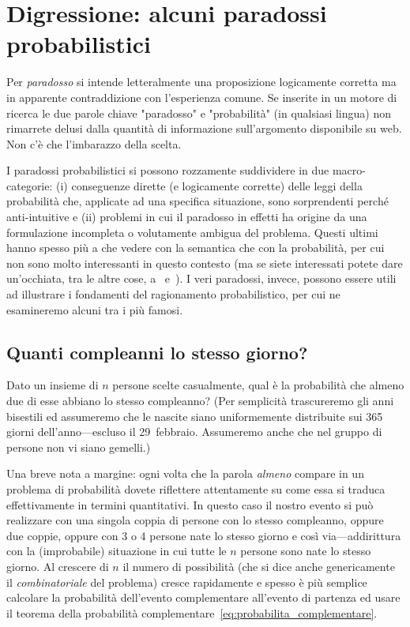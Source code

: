 \section{Digressione: alcuni paradossi probabilistici}

Per \emph{paradosso} si intende letteralmente una proposizione logicamente
corretta ma in apparente contraddizione con l'esperienza comune. Se inserite
in un motore di ricerca le due parole chiave "paradosso" e "probabilità"
(in qualsiasi lingua) non rimarrete delusi dalla quantità di informazione
sull'argomento disponibile su web. Non c'è che l'imbarazzo della scelta.

I paradossi probabilistici si possono rozzamente suddividere in due
macro-categorie: (i) conseguenze dirette (e logicamente corrette) delle leggi
della probabilità che, applicate ad una specifica situazione, sono
sorprendenti perché anti-intuitive e (ii) problemi in cui il paradosso in
effetti ha origine da una formulazione incompleta o volutamente ambigua del
problema. Questi ultimi hanno spesso più a che vedere con la semantica che
con la probabilità, per cui non sono molto interessanti in questo contesto
(ma se siete interessati potete dare un'occhiata, tra le altre cose,
a~\cite{dagostini_bertrand} e~\cite{dagostini_boy_girl}). I veri
paradossi, invece, possono essere utili ad illustrare i fondamenti del
ragionamento probabilistico, per cui ne esamineremo alcuni tra i più famosi.


\subsection{Quanti compleanni lo stesso giorno?}
\label{sec:paradosso_compleanni}

Dato un insieme di $n$ persone scelte casualmente, qual è la probabilità che
almeno due di esse abbiano lo stesso compleanno? (Per semplicità trascureremo
gli anni bisestili ed assumeremo che le nascite siano uniformemente
distribuite sui 365 giorni dell'anno---escluso il 29~febbraio. Assumeremo anche
che nel gruppo di persone non vi siano gemelli.)

Una breve nota a margine: ogni volta che la parola \emph{almeno} compare in un
problema di probabilità dovete riflettere attentamente su come essa si traduca
effettivamente in termini quantitativi. In questo caso il nostro evento
si può realizzare con una singola coppia di persone con lo stesso compleanno,
oppure due coppie, oppure con 3 o 4 persone nate lo stesso giorno e così
via---addirittura con la (improbabile) situazione in cui tutte le $n$ persone
sono nate lo stesso giorno. Al crescere di $n$ il numero di possibilità
(che si dice anche genericamente il \emph{combinatoriale} del problema) cresce
rapidamente e spesso è più semplice calcolare la probabilità dell'evento
complementare all'evento di partenza ed usare il teorema della probabilità
complementare~\eqref{eq:probabilita_complementare}.

